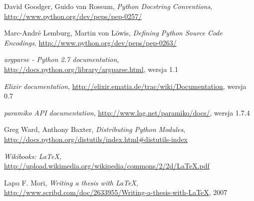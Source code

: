 \documentclass[00-praca-magisterska.tex]{subfiles}
\begin{document}
\begin{thebibliography}{9}
  David Goodger, Guido van Rossum,
  \emph{Python Docstring Conventions},
  \url{http://www.python.org/dev/peps/pep-0257/}

  Marc-André Lemburg, Martin von Löwis,
  \emph{Defining Python Source Code Encodings},
  \url{http://www.python.org/dev/peps/pep-0263/}

  \emph{argparse - Python 2.7 documentation},
  \url{http://docs.python.org/library/argparse.html},
  wersja 1.1

  \emph{Elixir documentation},
  \url{http://elixir.ematia.de/trac/wiki/Documentation},
  wersja 0.7


  \emph{paramiko API documentation},
  \url{http://www.lag.net/paramiko/docs/},
  wersja 1.7.4

  Greg Ward, Anthony Baxter,
  \emph{Distributing Python Modules},
  \url{http://docs.python.org/distutils/index.html#distutils-index}

  \emph{Wikibooks: \LaTeX},
  \url{http://upload.wikimedia.org/wikipedia/commons/2/2d/LaTeX.pdf}

  Lapo F. Mori, 
  \emph{Writing a thesis with \LaTeX},
  \url{http://www.scribd.com/doc/2633955/Writing-a-thesis-with-LaTeX},
  2007

\end{thebibliography}


\end{document}
